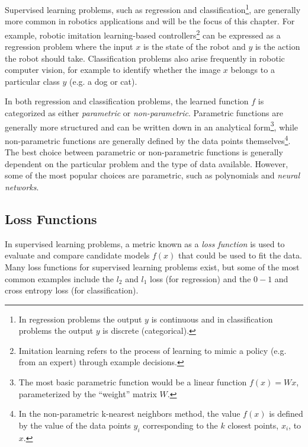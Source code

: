 Supervised learning problems, such as regression and classification\footnote{In regression problems the output $y$ is continuous and in classification problems the output $y$ is discrete (categorical).}, are generally more common in robotics applications and will be the focus of this chapter. For example, robotic imitation learning-based controllers\footnote{Imitation learning refers to the process of learning to mimic a policy (e.g. from an expert) through example decisions.} can be expressed as a regression problem where the input $x$ is the state of the robot and $y$ is the action the robot should take. Classification problems also arise frequently in robotic computer vision, for example to identify whether the image $x$ belongs to a particular class $y$ (e.g. a dog or cat).

In both regression and classification problems, the learned function $f$ is categorized as either \textit{parametric} or \textit{non-parametric}. Parametric functions are generally more structured and can be written down in an analytical form\footnote{The most basic parametric function would be a linear function $f(x) = Wx$, parameterized by the ``weight'' matrix $W$.}, while non-parametric functions are generally defined by the data points themselves\footnote{In the non-parametric k-nearest neighbors method, the value $f(x)$ is defined by the value of the data points $y_i$ corresponding to the $k$ closest points, $x_i$, to $x$.}. The best choice between parametric or non-parametric functions is generally dependent on the particular problem and the type of data available. However, some of the most popular choices are parametric, such as polynomials and \textit{neural networks}.

\subsection{Loss Functions}
In supervised learning problems, a metric known as a \textit{loss function} is used to evaluate and compare candidate models $f(x)$ that could be used to fit the data. Many loss functions for supervised learning problems exist, but some of the most common examples include the $l_2$ and $l_1$ loss (for regression) and the $0 - 1$ and cross entropy loss (for classification).

